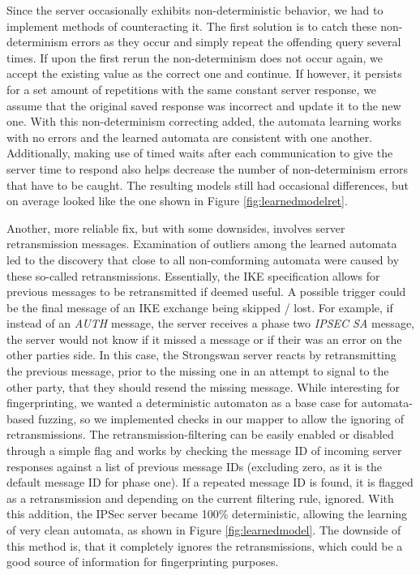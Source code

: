 \documentclass[runningheads]{llncs}
\begin{document}
Since the server occasionally exhibits non-deterministic behavior, we had to implement methods of counteracting it. The first solution is to catch these non-determinism errors as they occur and simply repeat the offending query several times. If upon the first rerun the non-determinism does not occur again, we accept the existing value as the correct one and continue. If however, it persists for a set amount of repetitions with the same constant server response, we assume that the original saved response was incorrect and update it to the new one. With this non-determinism correcting added, the automata learning works with no errors and the learned automata are consistent with one another. Additionally, making use of timed waits after each communication to give the server time to respond also helps decrease the number of non-determinism errors that have to be caught. The resulting models still had occasional differences, but on average looked like the one shown in Figure \ref{fig:learnedmodelret}.

Another, more reliable fix, but with some downsides, involves server retransmission messages. Examination of outliers among the learned automata led to the discovery that close to all non-comforming automata were caused by these so-called retransmissions. Essentially, the IKE specification allows for previous messages to be retransmitted if deemed useful. A possible trigger could be the final message of an IKE exchange being skipped / lost. For example, if instead of an \emph{AUTH} message, the server receives a phase two \emph{IPSEC SA} message, the server would not know if it missed a message or if their was an error on the other parties side. In this case, the Strongswan server reacts by retransmitting the previous message, prior to the missing one in an attempt to signal to the other party, that they should resend the missing message. 
While interesting for fingerprinting, we wanted a deterministic automaton as a base case for automata-based fuzzing, so we implemented checks in our mapper to allow the ignoring of retransmissions. The retransmission-filtering can be easily enabled or disabled through a simple flag and works by checking the message ID of incoming server responses against a list of previous message IDs (excluding zero, as it is the default message ID for phase one). If a repeated message ID is found, it is flagged as a retransmission and depending on the current filtering rule, ignored. With this addition, the IPSec server became 100\% deterministic, allowing the learning of very clean automata, as shown in Figure \ref{fig:learnedmodel}. The downside of this method is, that it completely ignores the retransmissions, which could be a good source of information for fingerprinting purposes.
\end{document}
